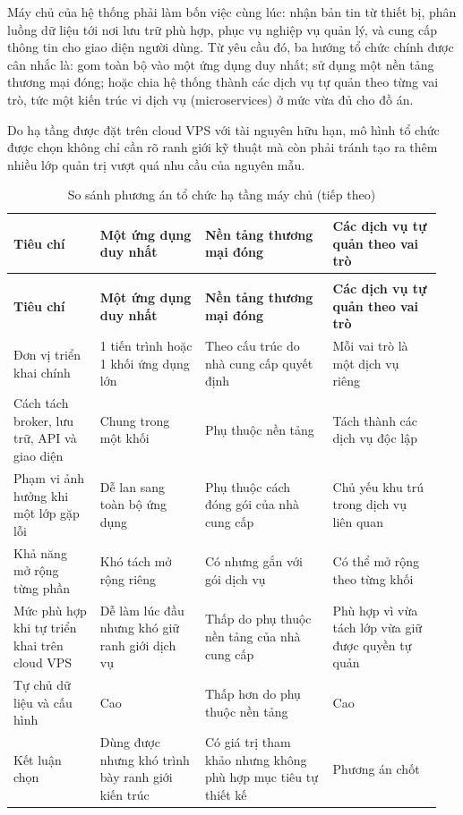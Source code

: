 \documentclass[a4paper]{extarticle}
\newcommand{\thesissettableid}[2]{%
  \renewcommand{\thetable}{#1}%
  \renewcommand{\theHtable}{#2}%
}
\begin{document}
Máy chủ của hệ thống phải làm bốn việc cùng lúc: nhận bản tin từ thiết bị, phân
luồng dữ liệu tới nơi lưu trữ phù hợp, phục vụ nghiệp vụ quản lý, và cung cấp
thông tin cho giao diện người dùng. Từ yêu cầu đó, ba hướng tổ chức chính được
cân nhắc là: gom toàn bộ vào một ứng dụng duy nhất; sử dụng một nền tảng thương
mại đóng; hoặc chia hệ thống thành các dịch vụ tự quản theo từng vai trò, tức
một kiến trúc vi dịch vụ (microservices) ở mức vừa đủ cho đồ án.

Do hạ tầng được đặt trên cloud VPS với tài nguyên hữu hạn, mô hình tổ chức được
chọn không chỉ cần rõ ranh giới kỹ thuật mà còn phải tránh tạo ra thêm nhiều lớp
quản trị vượt quá nhu cầu của nguyên mẫu.

{\thesissettableid{3.21}{condensed-bang-3-21-so-sanh-phuong-an-to-chuc-ha-tang-may-chu}
\def\LTcaptype{table}
\begin{longtable}{|L{0.192\linewidth}|L{0.23\linewidth}|L{0.284\linewidth}|L{0.245\linewidth}|}
\caption{So sánh phương án tổ chức hạ tầng máy chủ}\label{tab:condensed-bang-3-21-so-sanh-phuong-an-to-chuc-ha-tang-may-chu}\\
\hline
\textbf{Tiêu chí} & \textbf{Một ứng dụng duy nhất} & \textbf{Nền tảng thương mại đóng} & \textbf{Các dịch vụ tự quản theo vai trò} \\
\hline
\endfirsthead
\caption[]{So sánh phương án tổ chức hạ tầng máy chủ (tiếp theo)}\\
\hline
\textbf{Tiêu chí} & \textbf{Một ứng dụng duy nhất} & \textbf{Nền tảng thương mại đóng} & \textbf{Các dịch vụ tự quản theo vai trò} \\
\hline
\endhead
\endfoot
\endlastfoot
Đơn vị triển khai chính & 1 tiến trình hoặc 1 khối ứng dụng lớn & Theo cấu trúc do nhà cung cấp quyết định & Mỗi vai trò là một dịch vụ riêng \\\hline
Cách tách broker, lưu trữ, API và giao diện & Chung trong một khối & Phụ thuộc nền tảng & Tách thành các dịch vụ độc lập \\\hline
Phạm vi ảnh hưởng khi một lớp gặp lỗi & Dễ lan sang toàn bộ ứng dụng & Phụ thuộc cách đóng gói của nhà cung cấp & Chủ yếu khu trú trong dịch vụ liên quan \\\hline
Khả năng mở rộng từng phần & Khó tách mở rộng riêng & Có nhưng gắn với gói dịch vụ & Có thể mở rộng theo từng khối \\\hline
Mức phù hợp khi tự triển khai trên cloud VPS & Dễ làm lúc đầu nhưng khó giữ ranh giới dịch vụ & Thấp do phụ thuộc nền tảng của nhà cung cấp & Phù hợp vì vừa tách lớp vừa giữ được quyền tự quản \\\hline
Tự chủ dữ liệu và cấu hình & Cao & Thấp hơn do phụ thuộc nền tảng & Cao \\\hline
Kết luận chọn & Dùng được nhưng khó trình bày ranh giới kiến trúc & Có giá trị tham khảo nhưng không phù hợp mục tiêu tự thiết kế & Phương án chốt \\\hline
\end{longtable}
}
\end{document}
